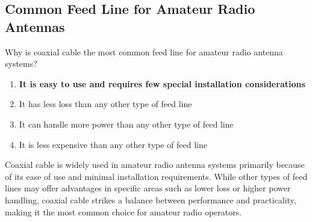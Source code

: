 \subsection{Common Feed Line for Amateur Radio Antennas}
\label{T9B03}

\begin{tcolorbox}[colback=gray!10!white,colframe=black!75!black,title=T9B03]
Why is coaxial cable the most common feed line for amateur radio antenna systems?
\begin{enumerate}[noitemsep]
    \item \textbf{It is easy to use and requires few special installation considerations}
    \item It has less loss than any other type of feed line
    \item It can handle more power than any other type of feed line
    \item It is less expensive than any other type of feed line
\end{enumerate}
\end{tcolorbox}

Coaxial cable is widely used in amateur radio antenna systems primarily because of its ease of use and minimal installation requirements. While other types of feed lines may offer advantages in specific areas such as lower loss or higher power handling, coaxial cable strikes a balance between performance and practicality, making it the most common choice for amateur radio operators.